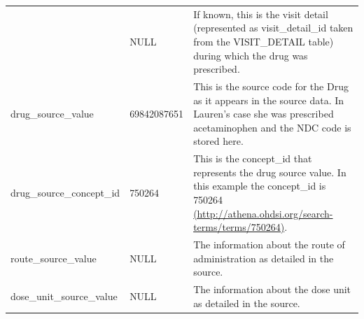 \documentclass[]{book}
\begin{document}
\begin{longtable}[]{@{}lll@{}}
\begin{minipage}[t]{0.30\columnwidth}
\end{minipage} & \begin{minipage}[t]{0.14\columnwidth}\raggedright\strut
NULL\strut
\end{minipage} & \begin{minipage}[t]{0.47\columnwidth}\raggedright\strut
If known, this is the visit detail (represented as visit\_detail\_id
taken from the VISIT\_DETAIL table) during which the drug was
prescribed.\strut
\end{minipage}\tabularnewline
\begin{minipage}[t]{0.30\columnwidth}\raggedright\strut
drug\_source\_value\strut
\end{minipage} & \begin{minipage}[t]{0.14\columnwidth}\raggedright\strut
69842087651\strut
\end{minipage} & \begin{minipage}[t]{0.47\columnwidth}\raggedright\strut
This is the source code for the Drug as it appears in the source data.
In Lauren's case she was prescribed acetaminophen and the NDC code is
stored here.\strut
\end{minipage}\tabularnewline
\begin{minipage}[t]{0.30\columnwidth}\raggedright\strut
drug\_source\_concept\_id\strut
\end{minipage} & \begin{minipage}[t]{0.14\columnwidth}\raggedright\strut
750264\strut
\end{minipage} & \begin{minipage}[t]{0.47\columnwidth}\raggedright\strut
This is the concept\_id that represents the drug source value. In this
example the concept\_id is 750264
\href{http://athena.ohdsi.org/search-terms/terms/750264}{(http://athena.ohdsi.org/search-terms/terms/750264)}.\strut
\end{minipage}\tabularnewline
\begin{minipage}[t]{0.30\columnwidth}\raggedright\strut
route\_source\_value\strut
\end{minipage} & \begin{minipage}[t]{0.14\columnwidth}\raggedright\strut
NULL\strut
\end{minipage} & \begin{minipage}[t]{0.47\columnwidth}\raggedright\strut
The information about the route of administration as detailed in the
source.\strut
\end{minipage}\tabularnewline
\begin{minipage}[t]{0.30\columnwidth}\raggedright\strut
dose\_unit\_source\_value\strut
\end{minipage} & \begin{minipage}[t]{0.14\columnwidth}\raggedright\strut
NULL\strut
\end{minipage} & \begin{minipage}[t]{0.47\columnwidth}\raggedright\strut
The information about the dose unit as detailed in the source.\strut
\end{minipage}\tabularnewline
\bottomrule
\end{longtable}
\end{document}
